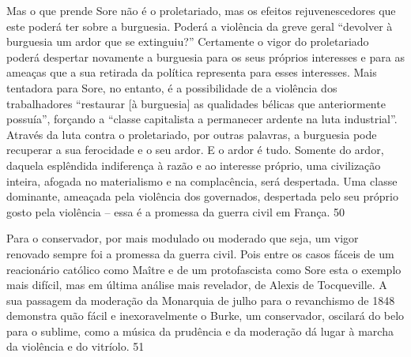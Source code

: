  
\par
 
Mas o que prende Sore não é o proletariado, mas os efeitos rejuvenescedores que este poderá ter sobre a burguesia. Poderá a violência da greve geral “devolver à burguesia um ardor que se extinguiu?” Certamente o vigor do proletariado poderá despertar novamente a burguesia para os seus próprios interesses e para as ameaças que a sua retirada da política representa para esses interesses. Mais tentadora para Sore, no entanto, é a possibilidade de a violência dos trabalhadores “restaurar [à burguesia] as qualidades bélicas que anteriormente possuía”, forçando a “classe capitalista a permanecer ardente na luta industrial”. Através da luta contra o proletariado, por outras palavras, a burguesia pode recuperar a sua ferocidade e o seu ardor. E o ardor é tudo. Somente do ardor, daquela esplêndida indiferença à razão e ao interesse próprio, uma civilização inteira, afogada no materialismo e na complacência, será despertada. Uma classe dominante, ameaçada pela violência dos governados, despertada pelo seu próprio gosto pela violência – essa é a promessa da guerra civil em França.
 {\color{blue} 50}  

 
\par
 
Para o conservador, por mais modulado ou moderado que seja, um vigor renovado sempre foi a promessa da guerra civil. Pois entre os casos fáceis de um reacionário católico como Maître e de um protofascista como Sore esta o exemplo mais difícil, mas em última análise mais revelador, de Alexis de Tocqueville. A sua passagem da moderação da Monarquia de julho para o revanchismo de 1848 demonstra quão fácil e inexoravelmente o Burke, um conservador, oscilará do belo para o sublime, como a música da prudência e da moderação dá lugar à marcha da violência e do vitríolo.
 {\color{blue} 51}  

 
\par
 
